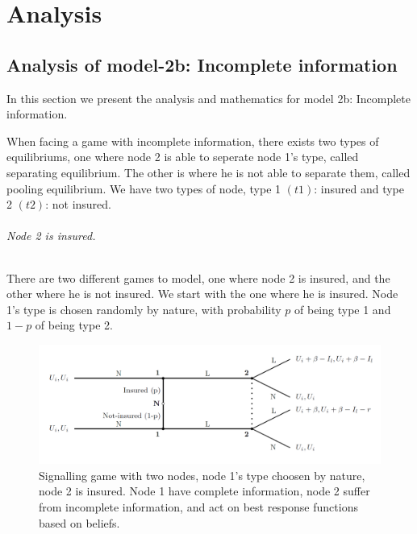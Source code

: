 \chapter{Analysis}
\section{Analysis of model-2b: Incomplete information}
\label{ch:analysis-of-model-2b}
In this section we present the analysis and mathematics for model 2b: Incomplete information.

When facing a game with incomplete information, there exists two types of equilibriums, one where node 2 is able to seperate node 1's type, called separating equilibrium. The other is where he is not able to separate them, called pooling equilibrium. 
We have two types of node, type 1 $(t1)$: insured and type 2 $(t2)$: not insured. 

\subparagraph{Node 2 is insured.}There are two different games to model, one where node 2 is insured, and the other where he is not insured. We start with the one where he is insured.
Node 1's type is chosen randomly by nature, with probability $p$ of being type 1 and $1-p$ of being type 2.
\begin{figure}[h]
\centering
  \centering
\includegraphics[width=1\linewidth]{../Figures/SignalingGameInsured.png}

\caption{Signalling game with two nodes, node 1's type choosen by nature, node 2 is insured. Node 1 have complete information, node 2 suffer from incomplete information, and act on best response functions based on beliefs. \label{fig:signalingInsured}}

\end{figure}

